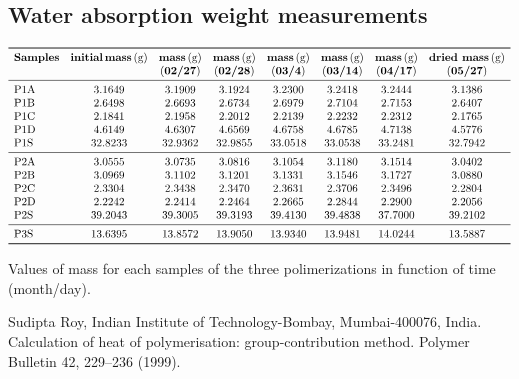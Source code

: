 \documentclass[a4paper, 11pt]{article}
\begin{document}
\begin{appendices}
\newpage
\section{Water absorption weight measurements}
\begin{table}[htp]
\centering
$
\begin{array}{lccccccc}
\toprule
\textbf{Samples} & \textbf{initial}\,\textbf{mass}\,(\text{g}) & \textbf{mass}\,(\text{g}) & \textbf{mass}\,(\text{g}) & \textbf{mass}\,(\text{g}) & \textbf{mass}\,(\text{g}) & \textbf{mass}\,(\text{g}) & \textbf{dried mass}\,(\text{g}) \\
& & (\textbf{02/27}) & (\textbf{02/28}) & (\textbf{03/4}) & (\textbf{03/14}) & (\textbf{04/17}) & (\textbf{05/27})\\
\midrule
\text{P1A} & 3.1649 & 3.1909 & 3.1924 & 3.2300 & 3.2418 & 3.2444 & 3.1386\\
\text{P1B} & 2.6498 & 2.6693 & 2.6734 & 2.6979 & 2.7104 & 2.7153 & 2.6407\\
\text{P1C} & 2.1841 & 2.1958 & 2.2012 & 2.2139 & 2.2232 & 2.2312 & 2.1765\\
\text{P1D} & 4.6149 & 4.6307 & 4.6569 & 4.6758 & 4.6785 & 4.7138 & 4.5776\\
\text{P1S} & 32.8233 & 32.9362 & 32.9855 & 33.0518 & 33.0538 & 33.2481 & 32.7942\\
\midrule
\text{P2A} & 3.0555 & 3.0735 & 3.0816 & 3.1054 & 3.1180 & 3.1514 & 3.0402\\
\text{P2B} & 3.0969 & 3.1102 & 3.1201 & 3.1331 & 3.1546 & 3.1727 & 3.0880\\
\text{P2C} & 2.3304 & 2.3438 & 2.3470 & 2.3631 & 2.3706 & 2.3496 & 2.2804\\
\text{P2D} & 2.2242 & 2.2414 & 2.2464 & 2.2665 & 2.2844 & 2.2900 & 2.2056\\
\text{P2S} & 39.2043 & 39.3005  & 39.3193 & 39.4130 & 39.4838 & 37.7000 & 39.2102\\
\midrule
\text{P3S} & 13.6395 & 13.8572 & 13.9050 & 13.9340 & 13.9481 & 14.0244 & 13.5887\\
\bottomrule
\end{array}
$
\caption{Values of mass for each samples of the three polimerizations in function of time (month/day).}
\label{tab:water}
\end{table}
\end{appendices}

\newpage

\thispagestyle{empty}

\begin{thebibliography}{11}

 Sudipta Roy, Indian Institute of Technology-Bombay, Mumbai-400076, India. Calculation of heat of polymerisation: group-contribution method. Polymer Bulletin 42, 229–236 (1999).

\end{thebibliography}
\end{document}
